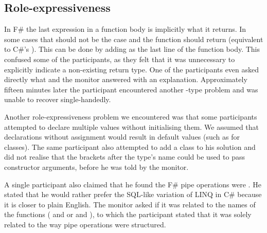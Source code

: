 \subsection{Role-expressiveness}
In F\# the last expression in a function body is implicitly what it returns. In some cases that should not be the case and the function should return  (equivalent to C\#'s ). This can be done by adding \ttt{()} as the last line of the function body. This confused some of the participants, as they felt that it was unnecessary to explicitly indicate a non-existing return type. One of the participants even asked directly what  and the monitor answered with an explanation. Approximately fifteen minutes later the participant encountered another -type problem and was unable to recover single-handedly.

Another role-expressiveness problem we encountered was that some participants attempted to  declare multiple values without initialising them. We assumed that  declarations without assignment would result in default values (such as  for classes). The same participant also attempted to add a class to his solution and did not realise that the brackets after the type's name could be used to pass constructor arguments, before he was told by the monitor. 

A single participant also claimed that he found the F\# pipe operations were . He stated that he would rather prefer the SQL-like variation of \gls{LINQ} in C\# because it is closer to plain English. The monitor asked if it was related to the names of the functions ( and  or  and ), to which the participant stated that it was solely related to the way pipe operations were structured.
